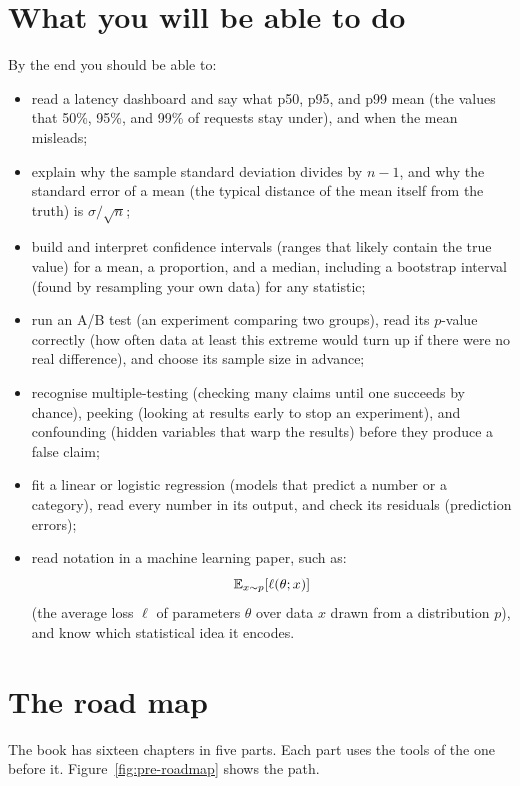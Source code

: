 \section*{What you will be able to do}

By the end you should be able to:
\begin{itemize}
  \item read a latency dashboard and say what p50, p95, and p99 mean (the
    values that 50\%, 95\%, and 99\% of requests stay under), and when the
    mean misleads;
  \item explain why the sample standard deviation divides by $n-1$, and why the standard error of a
    mean (the typical distance of the mean itself from the truth) is
    $\sigma/\sqrt{n}$;
  \item build and interpret confidence intervals (ranges that likely contain the true value) for a mean, a proportion, and
    a median, including a bootstrap interval (found by resampling your own data) for any statistic;
  \item run an A/B test (an experiment comparing two groups), read its $p$-value correctly (how often data at
    least this extreme would turn up if there were no real difference), and
    choose its sample size in advance;
  \item recognise multiple-testing (checking many claims until one succeeds by chance), peeking (looking at results early to stop an experiment), and confounding (hidden variables that warp the results) before they
    produce a false claim;
  \item fit a linear or logistic regression (models that predict a number or a category), read every number in its output,
    and check its residuals (prediction errors);
  \item read notation in a machine learning paper, such as:
    \[ \operatorname{\mathbb{E}}_{x\sim p}[\ell(\theta;x)] \]
    (the average loss $\ell$ of parameters $\theta$ over data $x$ drawn from a distribution $p$), and know which statistical idea it encodes.
\end{itemize}

\section*{The road map}

The book has sixteen chapters in five parts. Each part uses the tools of the
one before it. Figure~\ref{fig:pre-roadmap} shows the path.

